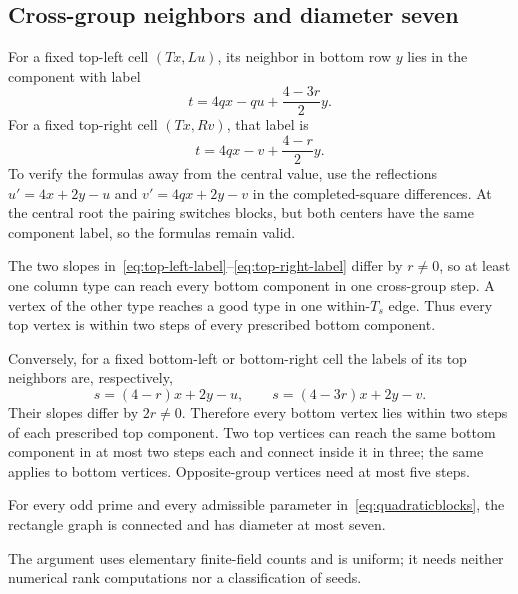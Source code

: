 \subsection{Cross-group neighbors and diameter seven}
For a fixed top-left cell $(Tx,Lu)$, its neighbor in bottom row $y$ lies in the component with label
\begin{equation}\label{eq:top-left-label}
 t=4qx-qu+\frac{4-3r}{2}y.
\end{equation}
For a fixed top-right cell $(Tx,Rv)$, that label is
\begin{equation}\label{eq:top-right-label}
 t=4qx-v+\frac{4-r}{2}y.
\end{equation}
To verify the formulas away from the central value, use the reflections $u'=4x+2y-u$ and $v'=4qx+2y-v$ in the completed-square differences. At the central root the pairing switches blocks, but both centers have the same component label, so the formulas remain valid.

The two slopes in~\eqref{eq:top-left-label}--\eqref{eq:top-right-label} differ by $r\ne0$, so at least one column type can reach every bottom component in one cross-group step. A vertex of the other type reaches a good type in one within-$T_s$ edge. Thus every top vertex is within two steps of every prescribed bottom component.

Conversely, for a fixed bottom-left or bottom-right cell the labels of its top neighbors are, respectively,
\begin{equation}\label{eq:reverse-labels}
 s=(4-r)x+2y-u,\qquad s=(4-3r)x+2y-v.
\end{equation}
Their slopes differ by $2r\ne0$. Therefore every bottom vertex lies within two steps of each prescribed top component. Two top vertices can reach the same bottom component in at most two steps each and connect inside it in three; the same applies to bottom vertices. Opposite-group vertices need at most five steps.

\begin{theorem}\label{thm:quadraticdiameter}
For every odd prime and every admissible parameter in~\eqref{eq:quadraticblocks}, the rectangle graph is connected and has diameter at most seven.
\end{theorem}
The argument uses elementary finite-field counts and is uniform; it needs neither numerical rank computations nor a classification of seeds.

